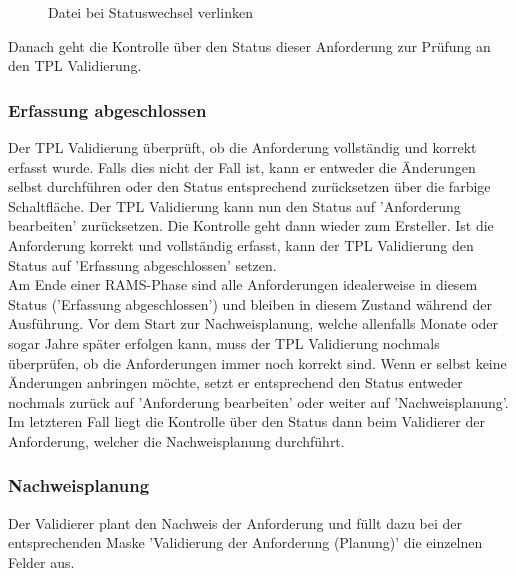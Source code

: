 \begin{figure}[H]
\caption{Datei bei Statuswechsel verlinken}
\end{figure}

Danach geht die Kontrolle über den Status dieser Anforderung zur Prüfung an den TPL Validierung. 

\subsubsection{Erfassung abgeschlossen}

Der TPL Validierung überprüft, ob die Anforderung vollständig und korrekt erfasst wurde. Falls dies nicht der Fall ist, kann er entweder die Änderungen selbst durchführen oder den Status entsprechend zurücksetzen über die farbige Schaltfläche. Der TPL Validierung kann nun den Status auf 'Anforderung bearbeiten' zurücksetzen. Die Kontrolle geht dann wieder zum Ersteller. Ist die Anforderung korrekt und vollständig erfasst, kann der TPL Validierung den Status auf 'Erfassung abgeschlossen' setzen. \\

Am Ende einer RAMS-Phase sind alle Anforderungen idealerweise in diesem Status ('Erfassung abgeschlossen') und bleiben in diesem Zustand während der Ausführung. Vor dem Start zur Nachweisplanung, welche allenfalls Monate oder sogar Jahre später erfolgen kann, muss der TPL Validierung nochmals überprüfen, ob die Anforderungen immer noch korrekt sind. Wenn er selbst keine Änderungen anbringen möchte, setzt er entsprechend den Status entweder nochmals zurück auf 'Anforderung bearbeiten' oder weiter auf 'Nachweisplanung'. Im letzteren Fall liegt die Kontrolle über den Status dann beim Validierer der Anforderung, welcher die Nachweisplanung durchführt. 

\subsubsection{Nachweisplanung}
\label{bkm:Ref2018071811}

Der Validierer plant den Nachweis der Anforderung und füllt dazu bei der entsprechenden Maske 'Validierung der Anforderung (Planung)'  die einzelnen Felder aus. 

